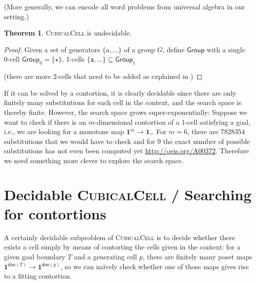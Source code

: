 \documentclass[11pt]{article}
\theoremstyle{definition}
\newtheorem{theorem}{Theorem}
\newcommand{\problem}[1]{\textsc{{#1}}}
\newcommand{\pint}[1]{\mathbf{1}^{#1}}
\renewcommand{\dim}[1]{\mathsf{dim}({#1})}
\newcommand{\smap}[1]{s^{{#1}}}
\newcommand{\dmap}[2]{d^{({#1} , {#2})}}
\newcommand{\cset}[1]{\mathsf{{#1}}}
\begin{document}
(More generally, we can encode all word problems from universal algebra in our setting.)

\begin{theorem}
  \problem{CubicalCell} is undecidable.
  \begin{proof}


    Given a set of generators $\{a, ...\}$ of a group $G$, define $\cset{Group}$
    with a single 0-cell $\cset{Group}_0 = \{ \cset{\star} \}$, 
    1-cells $\{\cset{a} , ... \} \subseteq \cset{Group}_1$ 

    (there are more 2-cells that need to be added as explained in \cite[Sect. 6.3]{bezem14_model_type_theor_cubic_sets})

\end{proof}
\end{theorem}

If it can be solved by a contortion, it is clearly decidable since there are
only finitely many substitutions for each cell in the context, and the search
space is thereby finite. However, the search space grows super-exponentially:
Suppose we want to check if there is an $m$-dimensional contortion of a 1-cell
satisfying a goal, i.e., we are looking for a monotone map $\pint{m} \to
\pint{}$,. For $m = 6$, there are $7828354$ substitutions that we would have to
check and for 9 the exact number of possible substitutions has not even been
computed yet \url{http://oeis.org/A00372}. Therefore we need something more
clever to explore the search space.



\section{Decidable \problem{CubicalCell} / Searching for contortions}

A certainly decidable subproblem of \problem{CubicalCell} is to decide whether
there exists a cell simply by means of contorting the cells given in the
context: for a given goal boundary $T$ and a generating cell $p$, there are
finitely many poset maps $\pint{\dim{T}} \to \pint{\dim{p}}$, so we can
na\"ively check whether one of those maps gives rise to a fitting contortion. 
\end{document}
